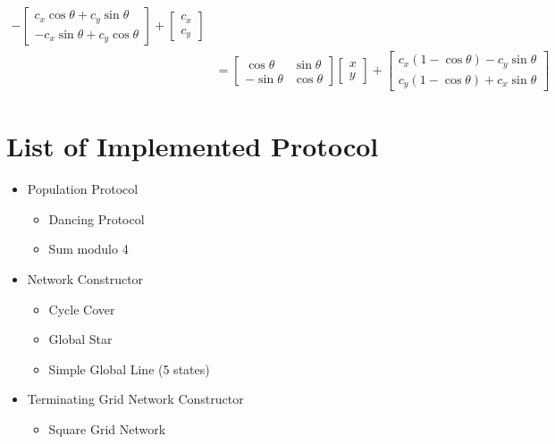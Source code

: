 \begin{equation*}
\begin{split}
          - \begin{bmatrix} c_{x}\cos\theta + c_{y}\sin\theta \\ -c_{x}\sin\theta + c_{y}\cos\theta \end{bmatrix} +
           \begin{bmatrix} c_{x} \\ c_{y} \end{bmatrix} \\
          &= \begin{bmatrix} \cos\theta & \sin\theta \\ -\sin\theta & \cos\theta \end{bmatrix} \begin{bmatrix} x \\ y \end{bmatrix}
          + \begin{bmatrix} c_{x}(1 - \cos\theta) - c_{y}\sin\theta \\ c_{y}(1 - \cos\theta) + c_{x}\sin\theta \end{bmatrix}
\end{split}
\end{equation*}

\section{List of Implemented Protocol}
\begin{itemize}
  \item Population Protocol
        \begin{itemize}
          \item Dancing Protocol
          \item Sum modulo 4
        \end{itemize}
  \item Network Constructor
        \begin{itemize}
          \item Cycle Cover
          \item Global Star
          \item Simple Global Line (5 states)
        \end{itemize}
  \item Terminating Grid Network Constructor
        \begin{itemize}
          \item Square Grid Network
        \end{itemize}
\end{itemize}
